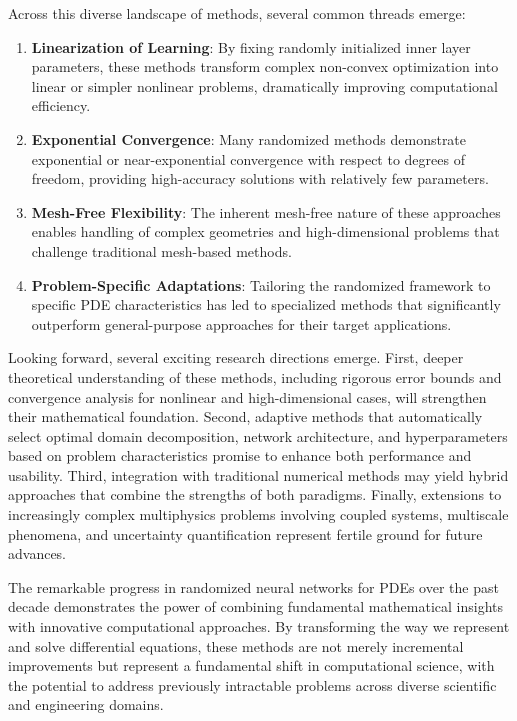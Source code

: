 \documentclass[11pt]{article}
\begin{document}
Across this diverse landscape of methods, several common threads emerge:

\begin{enumerate}
    \item \textbf{Linearization of Learning}: By fixing randomly initialized inner layer parameters, these methods transform complex non-convex optimization into linear or simpler nonlinear problems, dramatically improving computational efficiency.
    
    \item \textbf{Exponential Convergence}: Many randomized methods demonstrate exponential or near-exponential convergence with respect to degrees of freedom, providing high-accuracy solutions with relatively few parameters.
    
    \item \textbf{Mesh-Free Flexibility}: The inherent mesh-free nature of these approaches enables handling of complex geometries and high-dimensional problems that challenge traditional mesh-based methods.
    
    \item \textbf{Problem-Specific Adaptations}: Tailoring the randomized framework to specific PDE characteristics has led to specialized methods that significantly outperform general-purpose approaches for their target applications.
\end{enumerate}

Looking forward, several exciting research directions emerge. First, deeper theoretical understanding of these methods, including rigorous error bounds and convergence analysis for nonlinear and high-dimensional cases, will strengthen their mathematical foundation. Second, adaptive methods that automatically select optimal domain decomposition, network architecture, and hyperparameters based on problem characteristics promise to enhance both performance and usability. Third, integration with traditional numerical methods may yield hybrid approaches that combine the strengths of both paradigms. Finally, extensions to increasingly complex multiphysics problems involving coupled systems, multiscale phenomena, and uncertainty quantification represent fertile ground for future advances.

The remarkable progress in randomized neural networks for PDEs over the past decade demonstrates the power of combining fundamental mathematical insights with innovative computational approaches. By transforming the way we represent and solve differential equations, these methods are not merely incremental improvements but represent a fundamental shift in computational science, with the potential to address previously intractable problems across diverse scientific and engineering domains.
\end{document}
